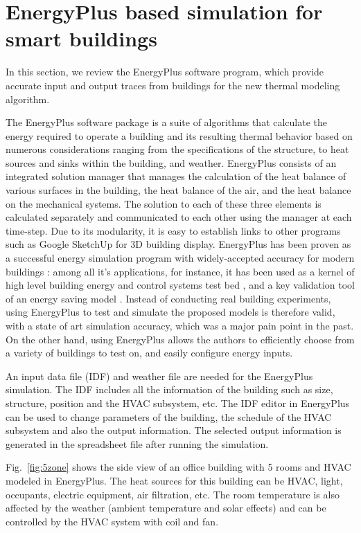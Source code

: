 \section{EnergyPlus based simulation for smart buildings}
\label{sec:energy_plus_review}
In this section, we review the EnergyPlus software program, which provide
accurate input and output traces from buildings for the new thermal
modeling algorithm.

The EnergyPlus software package is a suite of algorithms that calculate the
energy required to operate a building and its resulting thermal behavior based
on numerous considerations ranging from the specifications of the structure, to
heat sources and sinks within the building, and weather. EnergyPlus consists of
an integrated solution manager that manages the calculation of the heat balance
of various surfaces in the building, the heat balance of the air, and the heat
balance on the mechanical systems. The solution to each of these three elements
is calculated separately and communicated to each other using the manager at
each time-step. Due to its modularity, it is easy to establish links to other
programs such as Google SketchUp for 3D building display.
\textcolor{feb18rev}{EnergyPlus has been proven as a successful energy
simulation program with widely-accepted accuracy for modern buildings
\cite{yang2016review}: among all it's applications, for instance, it has been
used as a kernel of high level building energy and control systems test bed
\cite{wetter2011co}, and a key validation tool of an energy saving model
\cite{mardaljevic2009daylight}. Instead of conducting real building
experiments, using EnergyPlus to test and simulate the proposed models is
therefore valid, with a state of art simulation accuracy, which was a major
pain point in the past. On the other hand, using EnergyPlus allows the authors
to efficiently choose from a variety of buildings to test on, and easily
configure energy inputs.}

An input data file (IDF) and weather file are needed for the EnergyPlus
simulation. The IDF includes all the information of the building such
as size, structure, position and the HVAC subsystem, etc. The IDF
editor in EnergyPlus can be used to change parameters of the building, the
schedule of the HVAC subsystem and also the output information. The
selected output information is generated in the spreadsheet file
after running the simulation.

Fig.~\ref{fig:5zone} shows the side view of an office building
with 5 rooms and HVAC modeled in EnergyPlus. The heat sources for this building
can be HVAC, light, occupants, electric equipment, air filtration, etc. The
room temperature is also affected by the weather (ambient temperature and solar
effects) and can be controlled by the HVAC system with coil
and fan.


